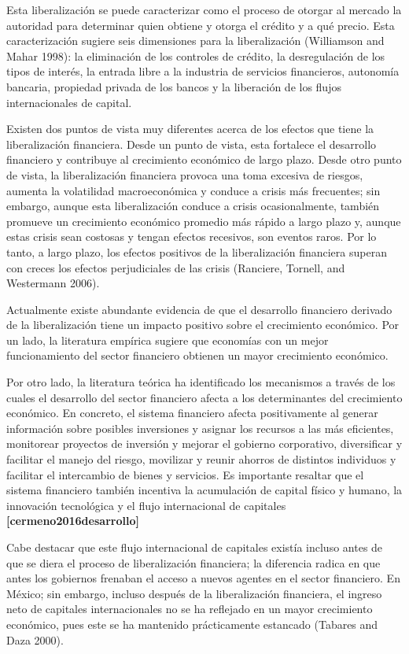 \documentclass[]{AEA}
\begin{document}
Esta liberalización se puede caracterizar como el proceso de otorgar al
mercado la autoridad para determinar quien obtiene y otorga el crédito y
a qué precio. Esta caracterización sugiere seis dimensiones para la
liberalización (Williamson and Mahar 1998): la eliminación de los
controles de crédito, la desregulación de los tipos de interés, la
entrada libre a la industria de servicios financieros, autonomía
bancaria, propiedad privada de los bancos y la liberación de los flujos
internacionales de capital.

Existen dos puntos de vista muy diferentes acerca de los efectos que
tiene la liberalización financiera. Desde un punto de vista, esta
fortalece el desarrollo financiero y contribuye al crecimiento económico
de largo plazo. Desde otro punto de vista, la liberalización financiera
provoca una toma excesiva de riesgos, aumenta la volatilidad
macroeconómica y conduce a crisis más frecuentes; sin embargo, aunque
esta liberalización conduce a crisis ocasionalmente, también promueve un
crecimiento económico promedio más rápido a largo plazo y, aunque estas
crisis sean costosas y tengan efectos recesivos, son eventos raros. Por
lo tanto, a largo plazo, los efectos positivos de la liberalización
financiera superan con creces los efectos perjudiciales de las crisis
(Ranciere, Tornell, and Westermann 2006).

Actualmente existe abundante evidencia de que el desarrollo financiero
derivado de la liberalización tiene un impacto positivo sobre el
crecimiento económico. Por un lado, la literatura empírica sugiere que
economías con un mejor funcionamiento del sector financiero obtienen un
mayor crecimiento económico.

Por otro lado, la literatura teórica ha identificado los mecanismos a
través de los cuales el desarrollo del sector financiero afecta a los
determinantes del crecimiento económico. En concreto, el sistema
financiero afecta positivamente al generar información sobre posibles
inversiones y asignar los recursos a las más eficientes, monitorear
proyectos de inversión y mejorar el gobierno corporativo, diversificar y
facilitar el manejo del riesgo, movilizar y reunir ahorros de distintos
individuos y facilitar el intercambio de bienes y servicios. Es
importante resaltar que el sistema financiero también incentiva la
acumulación de capital físico y humano, la innovación tecnológica y el
flujo internacional de capitales \textbf{{[}cermeno2016desarrollo{]}}

Cabe destacar que este flujo internacional de capitales existía incluso
antes de que se diera el proceso de liberalización financiera; la
diferencia radica en que antes los gobiernos frenaban el acceso a nuevos
agentes en el sector financiero. En México; sin embargo, incluso después
de la liberalización financiera, el ingreso neto de capitales
internacionales no se ha reflejado en un mayor crecimiento económico,
pues este se ha mantenido prácticamente estancado (Tabares and Daza
2000).
\end{document}

